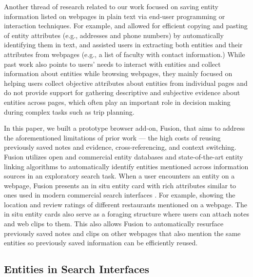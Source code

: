 Another thread of research related to our work focused on saving entity information listed on webpages in plain text via end-user programming or interaction techniques. For example, \cite{bier2006entity} and \cite{stylos2004citrine} allowed for efficient copying and pasting of entity attributes  (e.g., addresses and phone numbers) by automatically identifying them in text, and \cite{thresher,huynh2005piggy,dontcheva2006collecting} assisted users in extracting both entities and their attributes from webpages (e.g., a list of faculty with contact information.)
While past work also points to users' needs to interact with entities and collect information about entities while browsing webpages, they mainly focused on helping users collect objective attributes about entities from individual pages and do not provide support for gathering descriptive and subjective evidence about entities across pages, which often play an important role in decision making during complex tasks such as trip planning. 

In this paper, we built a prototype browser add-on, Fusion, that aims to address the aforementioned limitations of prior work --- the high costs of reusing previously saved notes and evidence, cross-referencing, and context switching. Fusion utilizes open and commercial entity databases \cite{dbpedia} and state-of-the-art entity linking algorithms \cite{spotlight} to automatically identify entities mentioned across information sources in an exploratory search task. When a user encounters an entity on a webpage, Fusion presents an in situ entity card with rich attributes similar to ones used in modern commercial search interfaces \cite{miliaraki2015selena,bota}. For example, showing the location and review ratings of different restaurants mentioned on a webpage. The in situ entity cards also serve as a foraging structure where users can attach notes and web clips to them. This also allows Fusion to automatically resurface previously saved notes and clips on other webpages that also mention the same entities so previously saved information can be efficiently reused.

\subsection{Entities in Search Interfaces}

